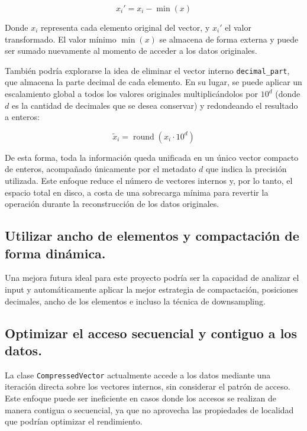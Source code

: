 \begin{equation}
x_i' = x_i - \min(x)
\end{equation}

Donde \( x_i \) representa cada elemento original del vector, y \( x_i' \) el valor transformado. El valor mínimo \(\min(x)\) se almacena de forma externa y puede ser sumado nuevamente al momento de acceder a los datos originales.

También podría explorarse la idea de eliminar el vector interno \texttt{decimal\_part}, que almacena la parte decimal de cada elemento. En su lugar, se puede aplicar un escalamiento global a todos los valores originales multiplicándolos por \(10^d\) (donde \(d\) es la cantidad de decimales que se desea conservar) y redondeando el resultado a enteros:

\begin{equation}
\tilde{x}_i = \operatorname{round}\!\left( x_i \cdot 10^d \right)
\end{equation}

De esta forma, toda la información queda unificada en un único vector compacto de enteros, acompañado únicamente por el metadato \(d\) que indica la precisión utilizada. Este enfoque reduce el número de vectores internos y, por lo tanto, el espacio total en disco, a costa de una sobrecarga mínima para revertir la operación durante la reconstrucción de los datos originales.

\subsection{Utilizar ancho de elementos y compactación de forma dinámica.}

Una mejora futura ideal para este proyecto podría ser la capacidad de analizar el input y automáticamente aplicar la mejor estrategia de compactación, posiciones decimales, ancho de los elementos e incluso la técnica de downsampling.

\subsection{Optimizar el acceso secuencial y contiguo a los datos.}
\label{proyecciones_vlc}
La clase \texttt{CompressedVector} actualmente accede a los datos mediante una iteración directa sobre los vectores internos, sin considerar el patrón de acceso. Este enfoque puede ser ineficiente en casos donde los accesos se realizan de manera contigua o secuencial, ya que no aprovecha las propiedades de localidad que podrían optimizar el rendimiento.

